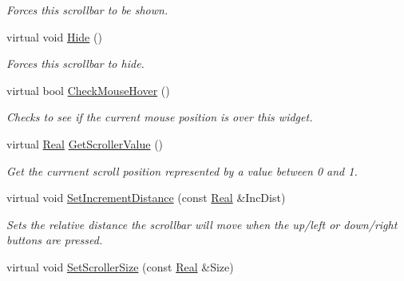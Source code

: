 \begin{DoxyCompactItemize}
\begin{DoxyCompactList}\small\item\em Forces this scrollbar to be shown. \item\end{DoxyCompactList}\item 
\hypertarget{classphys_1_1UI_1_1Scrollbar_aa0aa0d3441ec9c8162025a7e06ec773b}{
virtual void \hyperlink{classphys_1_1UI_1_1Scrollbar_aa0aa0d3441ec9c8162025a7e06ec773b}{Hide} ()}
\label{d0/d3e/classphys_1_1UI_1_1Scrollbar_aa0aa0d3441ec9c8162025a7e06ec773b}

\begin{DoxyCompactList}\small\item\em Forces this scrollbar to hide. \item\end{DoxyCompactList}\item 
virtual bool \hyperlink{classphys_1_1UI_1_1Scrollbar_a8afdd63e36a7fdc15bd8660d9800f2c5}{CheckMouseHover} ()
\begin{DoxyCompactList}\small\item\em Checks to see if the current mouse position is over this widget. \item\end{DoxyCompactList}\item 
virtual \hyperlink{namespacephys_af7eb897198d265b8e868f45240230d5f}{Real} \hyperlink{classphys_1_1UI_1_1Scrollbar_abd70ba640ef9475a77334aa209121812}{GetScrollerValue} ()
\begin{DoxyCompactList}\small\item\em Get the currnent scroll position represented by a value between 0 and 1. \item\end{DoxyCompactList}\item 
virtual void \hyperlink{classphys_1_1UI_1_1Scrollbar_a238097181d00ac3bbff0d31d2dc0b237}{SetIncrementDistance} (const \hyperlink{namespacephys_af7eb897198d265b8e868f45240230d5f}{Real} \&IncDist)
\begin{DoxyCompactList}\small\item\em Sets the relative distance the scrollbar will move when the up/left or down/right buttons are pressed. \item\end{DoxyCompactList}\item 
virtual void \hyperlink{classphys_1_1UI_1_1Scrollbar_a4bd103fd17411e5abc6a8c731ccb9183}{SetScrollerSize} (const \hyperlink{namespacephys_af7eb897198d265b8e868f45240230d5f}{Real} \&Size)

\end{DoxyCompactItemize}
